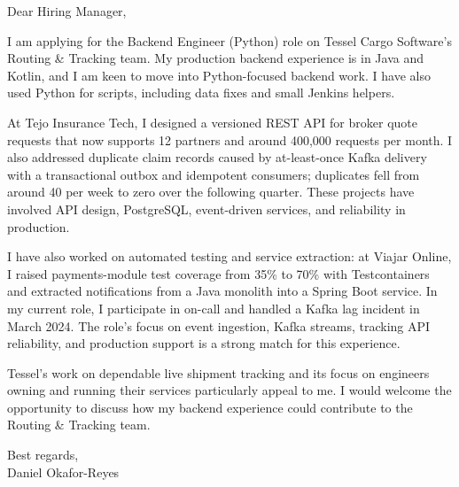 \documentclass[11pt,a4paper]{article}
\begin{document}
Dear Hiring Manager,

I am applying for the Backend Engineer (Python) role on Tessel Cargo Software's Routing & Tracking team. My production backend experience is in Java and Kotlin, and I am keen to move into Python-focused backend work. I have also used Python for scripts, including data fixes and small Jenkins helpers.

At Tejo Insurance Tech, I designed a versioned REST API for broker quote requests that now supports 12 partners and around 400,000 requests per month. I also addressed duplicate claim records caused by at-least-once Kafka delivery with a transactional outbox and idempotent consumers; duplicates fell from around 40 per week to zero over the following quarter. These projects have involved API design, PostgreSQL, event-driven services, and reliability in production.

I have also worked on automated testing and service extraction: at Viajar Online, I raised payments-module test coverage from 35\% to 70\% with Testcontainers and extracted notifications from a Java monolith into a Spring Boot service. In my current role, I participate in on-call and handled a Kafka lag incident in March 2024. The role's focus on event ingestion, Kafka streams, tracking API reliability, and production support is a strong match for this experience.

Tessel's work on dependable live shipment tracking and its focus on engineers owning and running their services particularly appeal to me. I would welcome the opportunity to discuss how my backend experience could contribute to the Routing & Tracking team.

Best regards,\\
Daniel Okafor-Reyes
\end{document}
